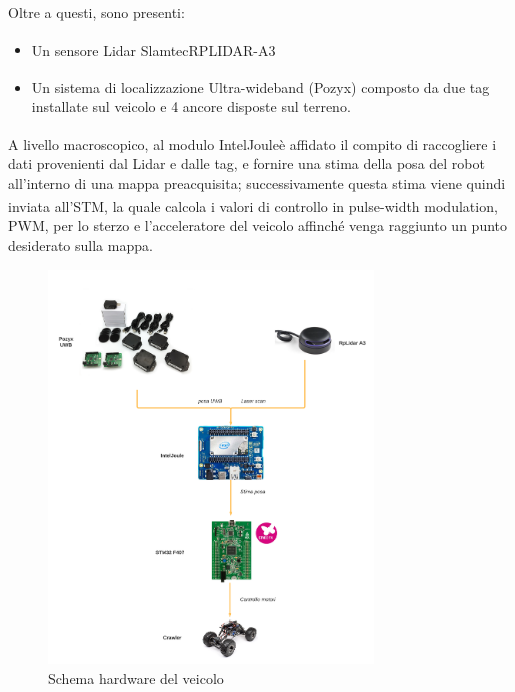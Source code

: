 \noindent Oltre a questi, sono presenti:
\begin{itemize}
    \item Un sensore Lidar Slamtec\textsuperscript\textregistered \hspace{1mm}RPLIDAR-A3\texttrademark
    \item Un sistema di localizzazione Ultra-wideband (Pozyx\textsuperscript\textregistered) composto da due tag installate sul veicolo e 4 ancore disposte sul terreno.
\end{itemize}

A livello macroscopico, al modulo Intel\textsuperscript\textregistered Joule\texttrademark \hspace{1mm}è affidato il compito di raccogliere i dati provenienti dal Lidar e dalle tag, e fornire una stima della posa del robot all'interno di una mappa preacquisita; successivamente questa stima viene quindi inviata all’STM\textsuperscript\textregistered, la quale calcola i valori di controllo in pulse-width modulation, PWM, per lo sterzo e l’acceleratore del veicolo affinché venga raggiunto un punto desiderato sulla mappa.

\begin{figure}[h]
\centering    
\includegraphics[width=0.77\textwidth]{Capitolo1/Figs/schema_hardware.pdf}
\caption[Schema hardware del veicolo]{Schema hardware del veicolo}
\label{fig:schema_hardware}
\end{figure}

